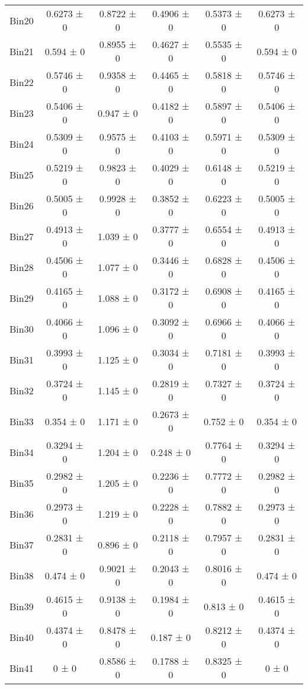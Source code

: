 \begin{tabular}{@{\extracolsep{4pt}}lccccc@{}}
     Bin20 & 0.6273 ± 0 & 0.8722 ± 0 & 0.4906 ± 0 & 0.5373 ± 0 & 0.6273 ± 0 \\ 
     Bin21 & 0.594 ± 0 & 0.8955 ± 0 & 0.4627 ± 0 & 0.5535 ± 0 & 0.594 ± 0 \\ 
     Bin22 & 0.5746 ± 0 & 0.9358 ± 0 & 0.4465 ± 0 & 0.5818 ± 0 & 0.5746 ± 0 \\ 
     Bin23 & 0.5406 ± 0 & 0.947 ± 0 & 0.4182 ± 0 & 0.5897 ± 0 & 0.5406 ± 0 \\ 
     Bin24 & 0.5309 ± 0 & 0.9575 ± 0 & 0.4103 ± 0 & 0.5971 ± 0 & 0.5309 ± 0 \\ 
     Bin25 & 0.5219 ± 0 & 0.9823 ± 0 & 0.4029 ± 0 & 0.6148 ± 0 & 0.5219 ± 0 \\ 
     Bin26 & 0.5005 ± 0 & 0.9928 ± 0 & 0.3852 ± 0 & 0.6223 ± 0 & 0.5005 ± 0 \\ 
     Bin27 & 0.4913 ± 0 & 1.039 ± 0 & 0.3777 ± 0 & 0.6554 ± 0 & 0.4913 ± 0 \\ 
     Bin28 & 0.4506 ± 0 & 1.077 ± 0 & 0.3446 ± 0 & 0.6828 ± 0 & 0.4506 ± 0 \\ 
     Bin29 & 0.4165 ± 0 & 1.088 ± 0 & 0.3172 ± 0 & 0.6908 ± 0 & 0.4165 ± 0 \\ 
     Bin30 & 0.4066 ± 0 & 1.096 ± 0 & 0.3092 ± 0 & 0.6966 ± 0 & 0.4066 ± 0 \\ 
     Bin31 & 0.3993 ± 0 & 1.125 ± 0 & 0.3034 ± 0 & 0.7181 ± 0 & 0.3993 ± 0 \\ 
     Bin32 & 0.3724 ± 0 & 1.145 ± 0 & 0.2819 ± 0 & 0.7327 ± 0 & 0.3724 ± 0 \\ 
     Bin33 & 0.354 ± 0 & 1.171 ± 0 & 0.2673 ± 0 & 0.752 ± 0 & 0.354 ± 0 \\ 
     Bin34 & 0.3294 ± 0 & 1.204 ± 0 & 0.248 ± 0 & 0.7764 ± 0 & 0.3294 ± 0 \\ 
     Bin35 & 0.2982 ± 0 & 1.205 ± 0 & 0.2236 ± 0 & 0.7772 ± 0 & 0.2982 ± 0 \\ 
     Bin36 & 0.2973 ± 0 & 1.219 ± 0 & 0.2228 ± 0 & 0.7882 ± 0 & 0.2973 ± 0 \\ 
     Bin37 & 0.2831 ± 0 & 0.896 ± 0 & 0.2118 ± 0 & 0.7957 ± 0 & 0.2831 ± 0 \\ 
     Bin38 & 0.474 ± 0 & 0.9021 ± 0 & 0.2043 ± 0 & 0.8016 ± 0 & 0.474 ± 0 \\ 
     Bin39 & 0.4615 ± 0 & 0.9138 ± 0 & 0.1984 ± 0 & 0.813 ± 0 & 0.4615 ± 0 \\ 
     Bin40 & 0.4374 ± 0 & 0.8478 ± 0 & 0.187 ± 0 & 0.8212 ± 0 & 0.4374 ± 0 \\ 
     Bin41 & 0 ± 0 & 0.8586 ± 0 & 0.1788 ± 0 & 0.8325 ± 0 & 0 ± 0 \\ 

\end{tabular}
